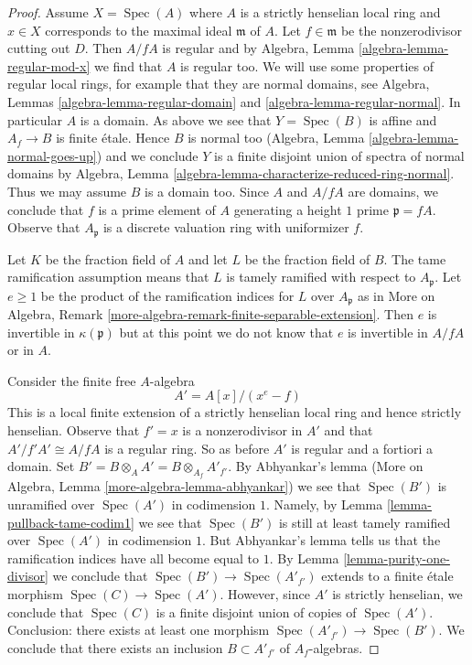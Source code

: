 \documentclass{stacks-project}
\theoremstyle{plain}
\theoremstyle{definition}
\theoremstyle{remark}
\numberwithin{equation}{subsection}
\def\Spec{\mathop{\mathrm{Spec}}}
\begin{document}
\begin{proof}
\medskip\noindent
Assume $X = \Spec(A)$ where $A$ is a strictly henselian local ring
and $x \in X$ corresponds to the maximal ideal $\mathfrak m$ of $A$.
Let $f \in \mathfrak m$ be the nonzerodivisor cutting out $D$.
Then $A/fA$ is regular and by Algebra, Lemma \ref{algebra-lemma-regular-mod-x}
we find that $A$ is regular too. We will use some properties of regular
local rings, for example that they are normal domains, see
Algebra, Lemmas \ref{algebra-lemma-regular-domain} and
\ref{algebra-lemma-regular-normal}. In particular $A$ is a domain.
As above we see that $Y = \Spec(B)$ is affine and $A_f \to B$
is finite \'etale. Hence $B$ is normal too
(Algebra, Lemma \ref{algebra-lemma-normal-goes-up})
and we conclude $Y$ is a finite disjoint union of spectra of normal domains by
Algebra, Lemma \ref{algebra-lemma-characterize-reduced-ring-normal}.
Thus we may assume $B$ is a domain too.
Since $A$ and $A/fA$ are domains, we conclude that $f$ is a prime
element of $A$ generating a height $1$ prime $\mathfrak p = fA$.
Observe that $A_\mathfrak p$ is a discrete valuation ring with uniformizer $f$.

\medskip\noindent
Let $K$ be the fraction field of $A$ and let $L$ be the fraction
field of $B$. The tame ramification assumption means that
$L$ is tamely ramified with respect to $A_\mathfrak p$.
Let $e \geq 1$ be the product of the ramification indices for $L$
over $A_\mathfrak p$ as in
More on Algebra, Remark \ref{more-algebra-remark-finite-separable-extension}.
Then $e$ is invertible in $\kappa(\mathfrak p)$ but
at this point we do not know that $e$ is invertible in $A/fA$
or in $A$.

\medskip\noindent
Consider the finite free $A$-algebra
$$
A' = A[x]/(x^e - f)
$$
This is a local finite extension of a strictly henselian local
ring and hence strictly henselian.
Observe that $f' = x$ is a nonzerodivisor in $A'$ and that
$A'/f'A' \cong A/fA$ is a regular ring. So as before $A'$
is regular and a fortiori a domain. Set
$B' = B \otimes_A A' = B \otimes_{A_f} A'_{f'}$.
By Abhyankar's lemma
(More on Algebra, Lemma \ref{more-algebra-lemma-abhyankar})
we see that $\Spec(B')$ is unramified over $\Spec(A')$
in codimension $1$. Namely, by Lemma \ref{lemma-pullback-tame-codim1}
we see that $\Spec(B')$ is still at least tamely ramified
over $\Spec(A')$ in codimension $1$. But Abhyankar's lemma
tells us that the ramification indices have all become equal to $1$.
By Lemma \ref{lemma-purity-one-divisor} we conclude that
$\Spec(B') \to \Spec(A'_{f'})$ extends to a finite \'etale morphism
$\Spec(C) \to \Spec(A')$. However, since $A'$ is strictly henselian,
we conclude that $\Spec(C)$ is a finite disjoint union of copies
of $\Spec(A')$. Conclusion: there exists at least one morphism
$\Spec(A'_{f'}) \to \Spec(B')$. We conclude that there exists
an inclusion $B \subset A'_{f'}$ of $A_f$-algebras.


\end{proof}
\end{document}
